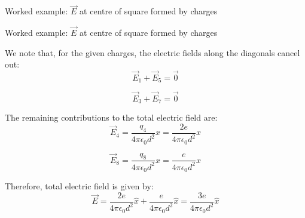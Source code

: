 {\begin{frame}{Worked example: $\vec{E}$ at centre of square formed by charges}
\end{frame}

%
%
%

\begin{frame}{Worked example: $\vec{E}$ at centre of square formed by charges}


We note that, for the given charges, the electric fields along the diagonals
cancel out:
\begin{equation*}
  \vec{E}_{1} + \vec{E}_{5} = \vec{0}
\end{equation*}

\begin{equation*}
  \vec{E}_{3} + \vec{E}_{7} = \vec{0}
\end{equation*}

The remaining contributions to the total electric field are:
\begin{equation*}
  \vec{E}_4 =
    \frac{q_4}{4\pi\epsilon_0 d^2} \hat{x} =
    \frac{2e}{4\pi\epsilon_0 d^2} \hat{x}
\end{equation*}

\begin{equation*}
  \vec{E}_8 =
    \frac{q_8}{4\pi\epsilon_0 d^2} \hat{x} =
    \frac{e}{4\pi\epsilon_0 d^2} \hat{x}
\end{equation*}

Therefore, total electric field is given by:
\begin{equation*}
  \vec{E} =
    \frac{2e}{4\pi\epsilon_0 d^2} \hat{x} +
    \frac{e}{4\pi\epsilon_0 d^2} \hat{x} =
    \frac{3e}{4\pi\epsilon_0 d^2} \hat{x}
\end{equation*}


\end{frame}


} %


%
%

